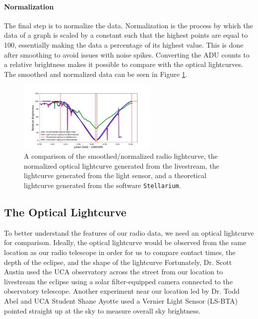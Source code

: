 \paragraph{Normalization}
The final step is to normalize the data.
Normalization is the process by which the data of a graph is scaled by a constant such that the highest points are equal to 100, essentially making the data a percentage of its highest value.
This is done after smoothing to avoid issues with noise spikes.
Converting the ADU counts to a relative brightness makes it possible to compare with the optical lightcurves.
The smoothed and normalized data can be seen in Figure \ref{fig:LightcurveComparison}.


\begin{figure}[h]
    \includegraphics[width=0.6\textwidth]{figures/LightcurveComparison.pdf}
    \caption{\label{fig:LightcurveComparison} A comparison of the smoothed/normalized radio lightcurve, the normalized optical lightcurve generated from the livestream, the lightcurve generated from the light sensor, and a theoretical lightcurve generated from the software \texttt{Stellarium}.}
\end{figure}



\subsection{\label{sec:optical}The Optical Lightcurve}

To better understand the features of our radio data, we need an optical lightcurve for comparison.
Ideally, the optical lightcurve would be observed from the same location as our radio telescope in order for us to compare contact times, the depth of the eclipse, and the shape of the lightcurve
Fortunately, Dr. Scott Austin used the UCA observatory across the street from our location to livestream the eclipse using a solar filter-equipped camera connected to the observatory telescope.
Another experiment near our location led by Dr. Todd Abel and UCA Student Shane Ayotte used a Vernier Light Sensor (LS-BTA) pointed straight up at the sky to measure overall sky brightness.
